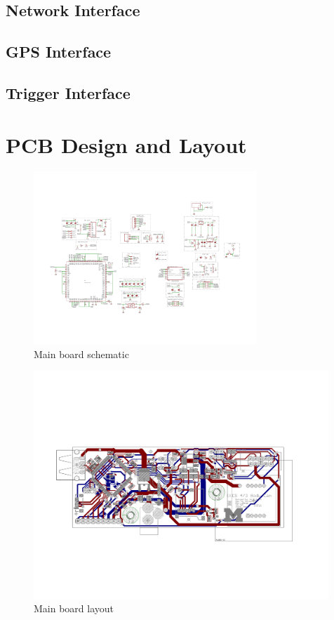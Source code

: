 \documentclass[12pt]{article}
\begin{document}
\subsection{Network Interface}


\newpage

\subsection{GPS Interface}


\newpage

\subsection{Trigger Interface}


\newpage

\section{PCB Design and Layout}

\begin{figure}[h]
    \centering
    \includegraphics[angle=-90,width=0.75\textwidth]{BodyCamBoard_sch}
    \caption{Main board schematic}
\end{figure}

\begin{figure}[h]
    \centering
    \includegraphics[angle=-90,width=0.99\textwidth]{BodyCamBoard_brd}
    \caption{Main board layout}
\end{figure}
\end{document}
